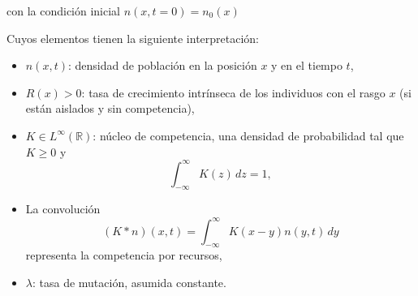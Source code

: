 con la condición inicial $n(x,t=0)=n_0(x)$

Cuyos elementos tienen la siguiente interpretación:

\begin{itemize}
	\item \( n(x,t) \): densidad de población en la posición \( x \) y en el tiempo \( t \),
	\item \( R(x) > 0 \): tasa de crecimiento intrínseca de los individuos con el rasgo \( x \) (si están aislados y sin competencia),
	\item \( K \in L^\infty(\mathbb{R}) \): núcleo de competencia, una densidad de probabilidad tal que \( K \geq 0 \) y
	      \[
		      \int_{-\infty}^{\infty} K(z) \, dz = 1,
	      \]
	\item La convolución
	      \[
		      (K * n)(x,t) = \int_{-\infty}^{\infty} K(x - y) n(y,t) \, dy
	      \]
	      representa la competencia por recursos,
	\item \( \lambda \): tasa de mutación, asumida constante.
\end{itemize}